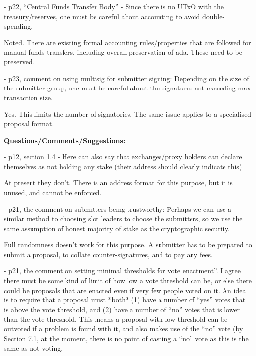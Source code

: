 \vspace{12pt}
- p22, ``Central Funds Transfer Body'' - Since there is no UTxO with the treasury/reserves, 
one must be careful about accounting to avoid double-spending. 

\vspace{12pt}
{\color{color02} Noted.  There are existing formal accounting rules/properties 
that are followed for manual funds transfers, including overall preservation of 
ada.  These need to be preserved.}

\vspace{12pt}
- p23, comment on using multisig for submitter signing: Depending on the size of 
the submitter group, one must be careful about the signatures not exceeding max 
transaction size.

\vspace{12pt}
{\color{color02} Yes.  This limits the number of signatories.  The same issue applies 
to a specialised proposal format.}

\vspace{24pt}
\begin{center}
\textbf{Questions/Comments/Suggestions:}
\end{center}

\vspace{12pt}
\baselineskip=12pt
\leftskip=0pt
- p12, section 1.4 - Here can also say that exchanges/proxy holders can declare 
themselves as not holding any stake (their address should clearly indicate this)

\vspace{12pt}
{\color{color02} At present they don't.  There is an address format for this purpose, 
but it is unused, and cannot be enforced.}

\vspace{12pt}
- p21, the comment on submitters being trustworthy: Perhaps we can use a similar 
method to choosing slot leaders to choose the submitters, so we use the same assumption 
of honest majority of stake as the cryptographic security.

\vspace{12pt}
{\color{color02} Full randomness doesn't work for this purpose.  A submitter has 
to be prepared to submit a proposal, to collate counter-signatures, and to pay 
any fees.}

\vspace{12pt}
- p21, the comment on setting minimal thresholds for vote enactment''. I agree 
there must be some kind of limit of how low a vote threshold can be, or else there 
could be proposals that are enacted even if very few people voted on it. An idea 
is to require that a proposal must *both* (1) have a number of ``yes'' votes that 
is above the vote threshold, and (2) have a number of ``no'' votes that is lower 
than the vote threshold. This means a proposal with low threshold can be outvoted 
if a problem is found with it, and also makes use of the ``no'' vote (by Section 
7.1, at the moment, there is no point of casting a ``no'' vote as this is the same 
as not voting.

